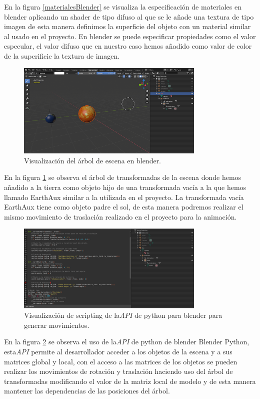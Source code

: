 \documentclass[a4paper]{book}
\begin{document}
En la figura \ref{materialesBlender} se visualiza la especificación de materiales en blender aplicando un shader de tipo difuso al que se le añade una
textura de tipo imagen de esta manera definimos la superficie del objeto con un material similar al usado en el proyecto. En blender
se puede especificar propiedades como el valor especular, el valor difuso que en nuestro caso hemos añadido como valor de color
de la superificie la textura de imagen.

\begin{figure}[H]
    \centering
    \includegraphics[width=9cm, keepaspectratio]{img/SceneSolar.png}
    \caption{Visualización del árbol de escena en blender.}
    \label{SceneSolar}
\end{figure}

En la figura \ref{SceneSolar} se observa el árbol de transformadas de la escena donde hemos añadido a la tierra como objeto hijo de una transformada
vacía a la que hemos llamado EarthAux similar a la utilizada en el proyecto. La transformada vacía EarthAux tiene como objeto padre el
sol, de esta manera podremos realizar el mismo movimiento de traslación realizado en el proyecto para la animación.

\begin{figure}[H]
    \centering
    \includegraphics[width=9cm, keepaspectratio]{img/Scripting.png}
    \caption{Visualización de scripting de la\textit{API} de python para blender para generar movimientos.}
    \label{Scripting}
\end{figure}

En la figura \ref{Scripting} se observa el uso de la\textit{API} de python de blender Blender Python, esta\textit{API} permite al desarrollador acceder a los objetos de la
escena y a sus matrices global y local, con el acceso a las matrices de los objetos se pueden realizar los movimientos de rotación y
traslación haciendo uso del árbol de transformadas modificando el valor de la matriz local de modelo y de esta manera mantener las
dependencias de las posiciones del árbol.
\end{document}
